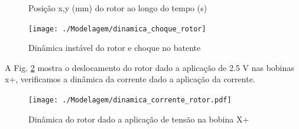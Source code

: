 \begin{figure}[th!]
\centering
\caption*{Posição x,y (mm) do rotor ao longo do tempo (s)}
\texttt{[image: ./Modelagem/dinamica\_choque\_rotor]}
\caption{Dinâmica instável do rotor e choque no batente}
\label{fig:dinamica:choque:rotor}
\end{figure}

A Fig. \ref{fig:dinamica:corrente:rotor} mostra o deslocamento do rotor dado a aplicação de 2.5 V nas bobinas x+,  verificamos a dinâmica da corrente dado a aplicação da corrente.

\begin{figure}[th!]
\centering
\texttt{[image: ./Modelagem/dinamica\_corrente\_rotor.pdf]}
\caption{Dinâmica do rotor dado a aplicação de tensão na bobina X+}
\label{fig:dinamica:corrente:rotor}
\end{figure}

